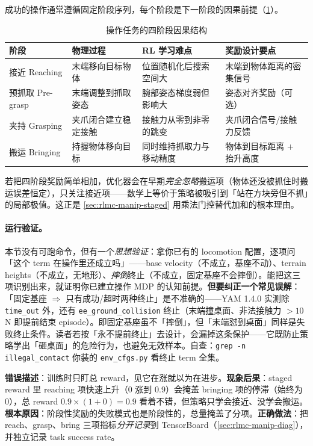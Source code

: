 成功的操作通常遵循固定阶段序列，每个阶段是下一阶段的因果前提（\cref{tab:rlmc-manip-stages}）。

\begin{table}[ht]
\centering
\small
\caption{操作任务的四阶段因果结构}
\label{tab:rlmc-manip-stages}
\begin{tabular}{@{}llll@{}}
\toprule
阶段 & 物理过程 & RL 学习难点 & 奖励设计要点 \\
\midrule
接近 Reaching & 末端移向目标物体 & 位置随机化后搜索空间大 & 末端到物体距离的密集信号 \\
预抓取 Pre-grasp & 末端调整到抓取姿态 & 腕部姿态梯度弱但影响大 & 姿态对齐奖励（可选） \\
夹持 Grasping & 夹爪闭合建立稳定接触 & 接触力从零到非零的跳变 & 夹爪闭合信号/接触力反馈 \\
搬运 Bringing & 持握物体移向目标 & 同时维持抓取力与移动精度 & 物体到目标距离 + 抬升高度 \\
\bottomrule
\end{tabular}
\end{table}

若把四阶段奖励简单相加，优化器会在早期\emph{完全忽略}搬运项（物体还没被抓住时搬运误差恒定），只关注接近项——数学上等价于策略被吸引到「站在方块旁但不抓」的局部极值。这正是 \cref{sec:rlmc-manip-staged} 用乘法门控替代加和的根本理由。

\paragraph{运行验证。}本节没有可跑命令，但有一个\emph{思想验证}：拿你已有的 locomotion 配置，逐项问「这个 term 在操作里还成立吗」——base velocity（不成立，基座不动）、terrain heights（不成立，无地形）、\emph{摔倒}终止（不成立，固定基座不会摔倒）。能把这三项识别出来，就证明你已建立操作 MDP 的认知前提。\textbf{但要纠正一个常见误解}：「固定基座 $\Rightarrow$ 只有成功/超时两种终止」是不准确的——YAM 1.4.0 实测除 \verb|time_out| 外，还有 \verb|ee_ground_collision| 终止（末端撞桌面、非法接触力 $>10$\,N 即提前结束 episode）。即固定基座虽不「摔倒」，但「末端怼到桌面」同样是失败终止条件。读者若按「永不提前终止」去设计，会漏掉这条保护——它既防止策略学出「砸桌面」的危险行为，也避免无效样本。自查：\verb|grep -n illegal_contact| 你装的 \verb|env_cfgs.py| 看终止 term 全集。

\begin{pitfall}
\textbf{错误描述}：训练时只盯总 reward，见它在涨就以为在进步。\textbf{现象后果}：staged reward 里 reaching 项快速上升（0 涨到 0.9）会掩盖 bringing 项的停滞（始终为 0），总 reward $0.9\times(1+0)=0.9$ 看着不错，但策略只学会接近、没学会搬运。\textbf{根本原因}：阶段性奖励的失败模式也是阶段性的，总量掩盖了分项。\textbf{正确做法}：把 reach、grasp、bring 三项指标\emph{分开记录}到 TensorBoard（\cref{sec:rlmc-manip-diag}），并独立记录 task success rate。
\end{pitfall}

